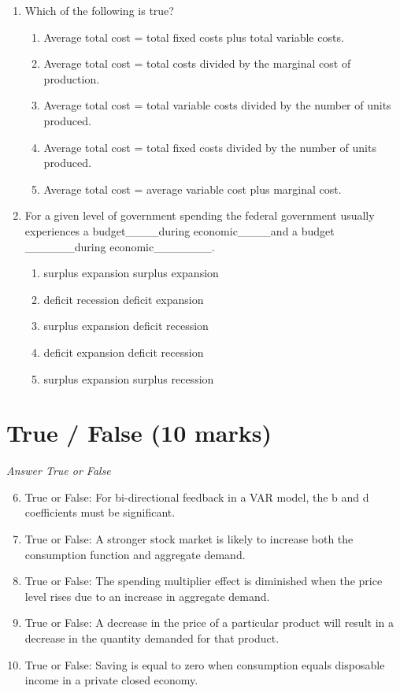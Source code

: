 \documentclass[12pt]{article}
\begin{document}
\begin{enumerate}[label=\arabic*.]
\item Which of the following is true?
\begin{enumerate}[label=(\alph*)]
    \item Average total cost = total fixed costs plus total variable costs.
    \item Average total cost = total costs divided by the marginal cost of production.
    \item Average total cost = total variable costs divided by the number of units produced.
    \item Average total cost = total fixed costs divided by the number of units produced.
    \item Average total cost = average variable cost plus marginal cost.
\end{enumerate}
\item For a given level of government spending the federal government usually experiences a budget\_\_\_\_during economic\_\_\_\_and a budget \_\_\_\_\_\_during economic\_\_\_\_\_\_\_.
\begin{enumerate}[label=(\alph*)]
    \item surplus expansion surplus expansion
    \item deficit recession deficit expansion
    \item surplus expansion deficit recession
    \item deficit expansion deficit recession
    \item surplus expansion surplus recession
\end{enumerate}
\end{enumerate}

\section*{True / False (10 marks)}
\textit{Answer True or False}
\begin{enumerate}[label=\arabic*.]
\setcounter{enumi}{5}
\item True or False: For bi-directional feedback in a VAR model, the b and d coefficients must be significant.
\item True or False: A stronger stock market is likely to increase both the consumption function and aggregate demand.
\item True or False: The spending multiplier effect is diminished when the price level rises due to an increase in aggregate demand.
\item True or False: A decrease in the price of a particular product will result in a decrease in the quantity demanded for that product.
\item True or False: Saving is equal to zero when consumption equals disposable income in a private closed economy.
\end{enumerate}
\end{document}

